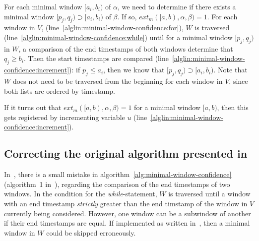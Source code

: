 For each minimal window $ [a_i, b_i) $ of $ \alpha $, we need to determine if there exists a minimal window $ [p_j, q_j) \supset [a_i, b_i) $ of $ \beta $. If so, $ ext_m([a, b), \alpha, \beta) = 1 $. For each window in $ V $, (line~\ref{alglin:minimal-window-confidence:for}), $ W $ is traversed (line~\ref{alglin:minimal-window-confidence:while}) until for a minimal window $ [p_j, q_j) $ in $ W $, a comparison of the end timestamps of both windows determine that $ q_j \geq b_i $. Then the start timestamps are compared (line~\ref{alglin:minimal-window-confidence:increment}): if $ p_j \leq a_i $, then we know that $ [p_j, q_j) \supset [a_i, b_i) $. Note that $ W $ does not need to be traversed from the beginning for each window in $ V $, since both lists are ordered by timestamp.

If it turns out that $ ext_m([a, b), \alpha, \beta) = 1 $ for a minimal window $ [a, b) $, then this gets registered by incrementing variable $ u $ (line~\ref{alglin:minimal-window-confidence:increment}).

\iffalse
\begin{figure}
\centering

\begin{tikzpicture}

\sequencetickmarks{15}{0}{0}

\foreach \x in {0,0.5,...,7}
    \draw [gray,ultra thin] (\x,2) -- (\x,-15pt);

\draw [very thick] (2.5,10pt) ++(0,-3pt) -- ++(0,3pt) -- ++(1.9,0) -- +(0,-3pt);
\windowthingy{(1,-5pt)}{5}
\windowthingy{(2,-10pt)}{6}

\end{tikzpicture}

\caption{Finding a minimal window of $ \beta $ that contains a given minimal window of $ \alpha $ (drawn above the sequence tick marks in bold).}
\label{fig:minimal-window-confidence}
\end{figure}
\fi

\subsection{Correcting the original algorithm presented in~\cite{cule2014marbles}}

In~\citep{cule2014marbles}, there is a small mistake in algorithm~\ref{alg:minimal-window-confidence} (algorithm~1 in~\citep{cule2014marbles}), regarding the comparison of the end timestamps of two windows. In the condition for the \emph{while}-statement, $ W $ is traversed until a window with an end timestamp \emph{strictly} greater than the end timstamp of the window in $ V $ currently being considered. However, one window can be a subwindow of another if their end timestamps are equal. If implemented as written in~\cite{cule2014marbles}, then a minimal window in $ W $ could be skipped erroneously.



